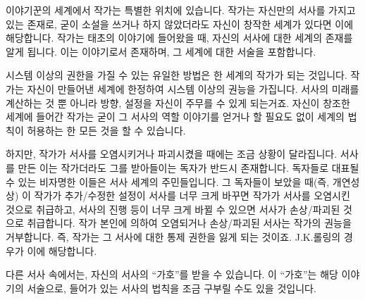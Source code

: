 \documentclass{report}
\begin{document}
	이야기꾼의 세계에서 작가는 특별한 위치에 있습니다. 작가는 자신만의 서사를 가지고 있는 존재로, 굳이 소설을 쓰거나 하지 않았더라도 자신이 창작한 세계가 있다면 이에 해당합니다.
	작가는 태초의 이야기에 들어왔을 때, 자신의 서사에 대한 세계의 존재를 알게 됩니다. 이는 이야기로서 존재하며, 그 세계에 대한 서술을 포함합니다.
	
	시스템 이상의 권한을 가질 수 있는 유일한 방법은 한 세계의 작가가 되는 것입니다. 작가는 자신이 만들어낸 세계에 한정하여 시스템 이상의 권능을 가집니다. 서사의 미래를 계산하는 것 뿐 아니라 방향, 설정을 자신이 주무를 수 있게 되는거죠. 자신이 창조한 세계에 들어간 작가는 굳이 그 서사의 역할 이야기를 얻거나 할 필요도 없이 세계의 법칙이 허용하는 한 모든 것을 할 수 있습니다.
	
	하지만, 작가가 서사를 오염시키거나 파괴시켰을 때에는 조금 상황이 달라집니다. 서사를 만든 이는 작가더라도 그를 받아들이는 독자가 반드시 존재합니다. 독자들로 대표될 수 있는 비자명한 이들은 서사 세계의 주민들입니다. 그 독자들이 보았을 때(즉, 개연성상) 이 작가가 추가/수정한 설정이 서사를 너무 크게 바꾸면 작가가 서사를 오염시킨 것으로 취급하고, 서사의 진행 등이 너무 크게 바뀔 수 있으면 서사가 손상/파괴된 것으로 취급합니다.
	작가 본인에 의하여 오염되거나 손상/파괴된 서사는 작가의 권능을 거부합니다. 즉, 작가는 그 서사에 대한 통제 권한을 잃게 되는 것이죠. \ifDLC J.K.롤링의 경우가 이에 해당합니다.\fi
	
	다른 서사 속에서는, 자신의 서사의 “가호”를 받을 수 있습니다. 이 “가호”는 해당 이야기의 서술으로, 들어가 있는 서사의 법칙을 조금 구부릴 수도 있을 것입니다.
\end{document}
